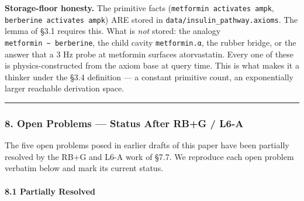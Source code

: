 \documentclass[
  11pt,
  a4paper,
]{article}
\begin{document}
\textbf{Storage-floor honesty.} The primitive facts
(\texttt{metformin\ activates\ ampk},
\texttt{berberine\ activates\ ampk}) ARE stored in
\texttt{data/insulin\_pathway.axioms}. The lemma of §3.1 requires this.
What is \emph{not} stored: the analogy
\texttt{metformin\ \textasciitilde{}\ berberine}, the child cavity
\texttt{metformin.α}, the rubber bridge, or the answer that a 3 Hz probe
at metformin surfaces atorvastatin. Every one of these is
physics-constructed from the axiom base at query time. This is what
makes it a thinker under the §3.4 definition --- a constant primitive
count, an exponentially larger reachable derivation space.

\begin{center}\rule{0.5\linewidth}{0.5pt}\end{center}

\subsubsection{8. Open Problems --- Status After RB+G /
L6-A}\label{open-problems-status-after-rbg-l6-a}

The five open problems posed in earlier drafts of this paper have been
partially resolved by the RB+G and L6-A work of §7.7. We reproduce each
open problem verbatim below and mark its current status.

\paragraph{8.1 Partially Resolved}\label{partially-resolved}
\end{document}
